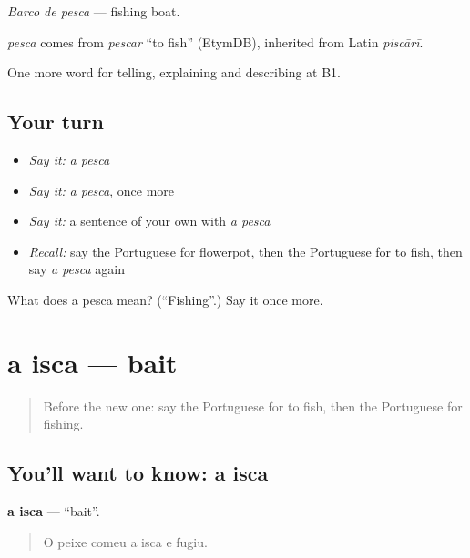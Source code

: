 \emph{Barco de pesca} — fishing boat.

\begin{cousinweb}
\emph{pesca} comes from \emph{pescar} \textquotedblleft{}to fish\textquotedblright{} (EtymDB), inherited from Latin \emph{piscārī}.
\end{cousinweb}

\begin{grammarlens}[title={What you've built}]
One more word for telling, explaining and describing at B1.
\end{grammarlens}

\subsection*{Your turn}
\begin{itemize}
\raggedright
  \item \emph{Say it:} \emph{a pesca}
  \item \emph{Say it:} \emph{a pesca}, once more
  \item \emph{Say it:} a sentence of your own with \emph{a pesca}
  \item \emph{Recall:} say the Portuguese for flowerpot, then the Portuguese for to fish, then say \emph{a pesca} again
\end{itemize}

\begin{tcolorbox}[breakable,colback=teal!4,colframe=teal!35!black,title={Before you move on}]
What does a pesca mean? (\textquotedblleft{}Fishing\textquotedblright{}.) Say it once more.
\end{tcolorbox}
\section[a isca]{a isca — bait}

\label{lesson:PT-C502-isca}



\begin{quote}
Before the new one: say the Portuguese for to fish, then the Portuguese for fishing.
\end{quote}

\subsection*{You'll want to know: a isca}
\textbf{a isca} — \textquotedblleft{}bait\textquotedblright{}.

\begin{quote}
O peixe comeu a isca e fugiu.
\end{quote}

